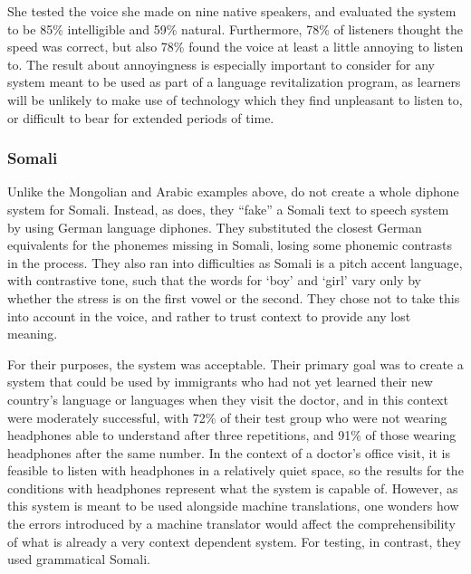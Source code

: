 \documentclass[12pt]{article}
\begin{document}
		She tested the voice she made on nine native speakers, and evaluated the system to be 85\% intelligible and 59\% natural. Furthermore, 78\% of listeners thought the speed was correct, but also 78\% found the voice at least a little annoying to listen to. The result about annoyingness is especially important to consider for any system meant to be used as part of a language revitalization program, as learners will be unlikely to make use of technology which they find unpleasant to listen to, or difficult to bear for extended periods of time. \par

		\subsubsection{Somali}

		Unlike the Mongolian and Arabic examples above, \citet{faking} do not create a whole diphone system for Somali. Instead, as \citet{de_speech} does, they ``fake'' a Somali text to speech system by using German language diphones. They substituted the closest German equivalents for the phonemes missing in Somali, losing some phonemic contrasts in the process. They also ran into difficulties as Somali is a pitch accent language, with contrastive tone, such that the words for `boy' and `girl' vary only by whether the stress is on the first vowel or the second. They chose not to take this into account in the voice, and rather to trust context to provide any lost meaning. \par

		For their purposes, the system was acceptable. Their primary goal was to create a system that could be used by immigrants who had not yet learned their new country's language or languages when they visit the doctor, and in this context were moderately successful, with 72\% of their test group who were not wearing headphones able to understand after three repetitions, and 91\% of those wearing headphones after the same number. In the context of a doctor's office visit, it is feasible to listen with headphones in a relatively quiet space, so the results for the conditions with headphones represent what the system is capable of. However, as this system is meant to be used alongside machine translations, one wonders how the errors introduced by a machine translator would affect the comprehensibility of what is already a very context dependent system. For testing, in contrast, they used grammatical Somali.\par
\end{document}
